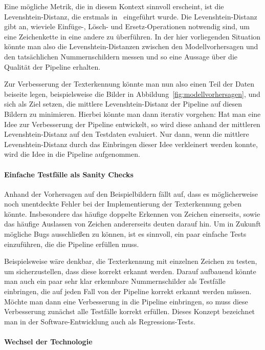 Eine m\"ogliche Metrik, die in diesem Kontext sinnvoll erscheint,
ist die Levenshtein-Distanz, die erstmals in~\cite{levenshtein}
eingef\"uhrt wurde.
Die Levenshtein-Distanz gibt an, wieviele Einf\"uge-, L\"osch- und
Ersetz-Operationen notwendig sind, um eine Zeichenkette in eine
andere zu \"uberf\"uhren.
In der hier vorliegenden Situation k\"onnte man also die
Levenshtein-Distanzen zwischen den Modellvorhersagen und den
tats\"achlichen Nummernschildern messen und so eine Aussage \"uber
die Qualit\"at der Pipeline erhalten.

Zur Verbesserung der Texterkennung k\"onnte man nun also einen Teil der
Daten beiseite legen, beispielsweise die Bilder in Abbildung~\ref{fig:modellvorhersagen},
und sich als Ziel setzen, die mittlere Levenshtein-Distanz der
Pipeline auf diesen Bildern zu minimieren.
Hierbei k\"onnte man dann iterativ vorgehen: Hat man eine Idee zur
Verbesserung der Pipeline entwickelt, so wird diese anhand der
mittleren Levenshtein-Distanz auf den Testdaten evaluiert.
Nur dann, wenn die mittlere Levenshtein-Distanz durch das Einbringen
dieser Idee verkleinert werden konnte, wird die Idee in die Pipeline
aufgenommen.

\paragraph{Einfache Testf\"alle als \glqq Sanity Checks\grqq{}}

Anhand der Vorhersagen auf den Beispielbildern f\"allt auf, dass es
m\"oglicherweise noch unentdeckte Fehler bei der Implementierung der
Texterkennung geben k\"onnte. Insbesondere das h\"aufige doppelte Erkennen
von Zeichen einerseits, sowie das h\"aufige Auslassen von Zeichen andererseits
deuten darauf hin. Um in Zukunft m\"ogliche \glqq Bugs\grqq{} ausschlie{\ss}en
zu k\"onnen, ist es sinnvoll, ein paar einfache Tests einzuf\"uhren,
die die Pipeline erf\"ullen muss.

Beispielsweise w\"are denkbar, die Texterkennung mit einzelnen Zeichen zu
testen, um sicherzustellen, dass diese korrekt erkannt werden.
Darauf aufbauend k\"onnte man auch ein paar sehr klar erkennbare
Nummernschilder als Testf\"alle einbringen, die auf jeden Fall von
der Pipeline korrekt erkannt werden m\"ussen.
M\"ochte man dann eine Verbesserung in die Pipeline einbringen, so
muss diese Verbesserung zun\"achst alle Testf\"alle korrekt erf\"ullen.
Dieses Konzept bezeichnet man in der Software-Entwicklung auch als
Regressions-Tests.

\paragraph{Wechsel der Technologie}

